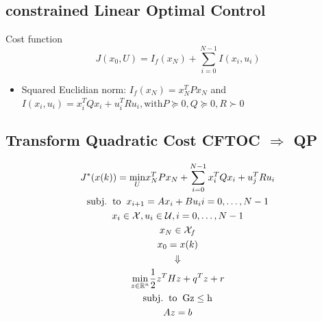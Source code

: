 \subsection{constrained Linear Optimal Control}
Cost function \[J(x_0,U) = I_f(x_N)+\sum^{N-1}_{i=0} I (x_i,u_i)\]
\begin{itemize}
    \item Squared  Euclidian norm: $I_f(x_N)=x_N^TPx_N$ and $I(x_i,u_i ) = x_i^TQx_i+u^T_iRu_i, \mathrm{with} P \succeq 0, Q\succeq 0, R\succ 0$
\end{itemize}
\subsection{Transform Quadratic Cost CFTOC $\Rightarrow$ QP}
\begin{gather*}
    J^*(x(k)) = \underset{U}{\mathrm{min}}x^T_NPx_N+ \sum^{N-1}_{i=0}x_i^TQx_i + u_j^TRu_i \\ 
    \mathrm{subj. \hspace{2mm} to \hspace{2mm}} x_{i+1}= Ax_{i} + Bu_{i} i = 0,\dotsc,N-1 \\
    x_{i} \in \mathcal{X}, u_i \in \mathcal{U}, i= 0,\dotsc,N-1 \\
    {x_{N} \in \mathcal{X}_f}\\
    x_{0} = x(k)\\
    \Downarrow\\
    \underset{z\in\mathbb{R}^n}{\mathrm{min}}\frac{1}{2}z^THz +q^Tz +r\\
    \mathrm{subj. \hspace{2mm} to\hspace{2mm} Gz\leq h}\\
    Az = b
\end{gather*}
